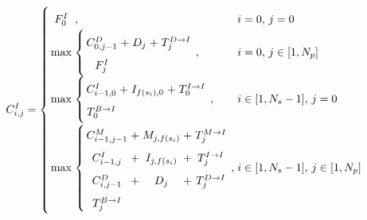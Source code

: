 \documentclass[a4paper,10pt,twoside]{scrartcl}
\begin{document}
\begin{equation} \label{std2} \arraycolsep=1.4pt\def\arraystretch{1.7}
  C_{i,j}^{I} = \left \{
		\begin{array}{c l l}
		  F^{I}_0 &,& i = 0,\, j = 0\\
		  
		  \max & \left \{
		  \begin{array} {ccccc}
		  C_{0,j-1}^{D}   &+& D_{j} &+& T^{D \rightarrow I}_j \\
		  F^{I}_j \\
		  \end{array} \right. , & i = 0,\, j \in [1,N_p]\\
		  
		  \max & \left \{
		  \begin{array} {ccccc}
		  C_{i-1,0}^{I}   &+& I_{f(s_i),0} &+& T^{I \rightarrow I}_0 \\
		  T^{B \rightarrow I}_0 \\
		  \end{array} \right. , & i \in [1,N_s-1],\, j = 0 \\
		
		  \max & \left \{
		  \begin{array} {ccccc}
		  C_{i-1,j-1}^{M} &+& M_{j, f(s_i)} &+& T^{M \rightarrow I}_j \\
		  C_{i-1,j}^{I}   &+& I_{j, f(s_i)} &+& T^{I \rightarrow I}_j \\
		  C_{i,j-1}^{D}   &+& D_{j} &+& T^{D \rightarrow I}_j \\
		  T^{B \rightarrow I}_j \\
		  \end{array} \right. , & i \in [1,N_s-1],\, j \in [1,N_p]\\
		\end{array}
		\right.
\end{equation}
\end{document}
